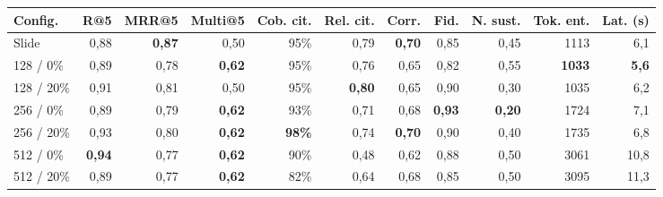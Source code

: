 \begin{tabular}{lrrrrrrrrrr}
\toprule
Config. & R@5 & MRR@5 & Multi@5 & Cob. cit. & Rel. cit. & Corr. & Fid. & N. sust. & Tok. ent. & Lat. (s) \\ 
\midrule
Slide & 0{,}88 & \textbf{0{,}87} & 0{,}50 & 95\% & 0{,}79 & \textbf{0{,}70} & 0{,}85 & 0{,}45 & 1113 & 6{,}1 \\
128 / 0\% & 0{,}89 & 0{,}78 & \textbf{0{,}62} & 95\% & 0{,}76 & 0{,}65 & 0{,}82 & 0{,}55 & \textbf{1033} & \textbf{5{,}6} \\
128 / 20\% & 0{,}91 & 0{,}81 & 0{,}50 & 95\% & \textbf{0{,}80} & 0{,}65 & 0{,}90 & 0{,}30 & 1035 & 6{,}2 \\
256 / 0\% & 0{,}89 & 0{,}79 & \textbf{0{,}62} & 93\% & 0{,}71 & 0{,}68 & \textbf{0{,}93} & \textbf{0{,}20} & 1724 & 7{,}1 \\
256 / 20\% & 0{,}93 & 0{,}80 & \textbf{0{,}62} & \textbf{98\%} & 0{,}74 & \textbf{0{,}70} & 0{,}90 & 0{,}40 & 1735 & 6{,}8 \\
512 / 0\% & \textbf{0{,}94} & 0{,}77 & \textbf{0{,}62} & 90\% & 0{,}48 & 0{,}62 & 0{,}88 & 0{,}50 & 3061 & 10{,}8 \\
512 / 20\% & 0{,}89 & 0{,}77 & \textbf{0{,}62} & 82\% & 0{,}64 & 0{,}68 & 0{,}85 & 0{,}50 & 3095 & 11{,}3 \\
\bottomrule
\end{tabular}
